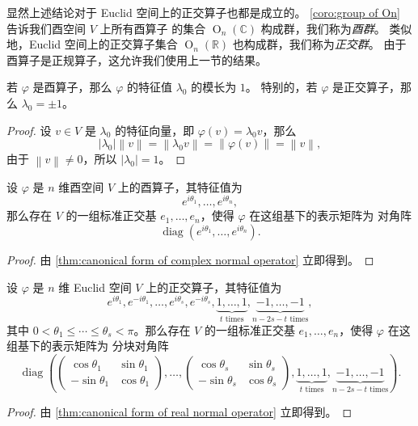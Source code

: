 \documentclass[fontset=none,zihao=-4]{Notes}
\DeclareMathOperator\diag{diag}
\DeclareMathOperator\Or{O}
\newcommand{\norm}[1]{\left\lVert#1\right\rVert}
\begin{document}
显然上述结论对于 Euclid 空间上的正交算子也都是成立的。
\autoref{coro:group of On} 告诉我们酉空间 $V$ 上所有酉算子
的集合 $\Or_n(\mathbb{C})$ 构成群，我们称为\emph{酉群}。
类似地，Euclid 空间上的正交算子集合 $\Or_n(\mathbb{R})$ 也构成群，我们称为\emph{正交群}。
由于酉算子是正规算子，这允许我们使用上一节的结果。

\begin{theorem}
  若 $\varphi$ 是酉算子，那么 $\varphi$ 的特征值 $\lambda_0$ 的模长为 $1$。
  特别的，若 $\varphi$ 是正交算子，那么 $\lambda_0=\pm 1$。 
\end{theorem}
\begin{proof}
  设 $v\in V$ 是 $\lambda_0$ 的特征向量，即 $\varphi(v)=\lambda_0v$，那么
  \[
    |\lambda_0|\norm{v}=\norm{\lambda_0v}
    =\norm{\varphi(v)}=\norm{v},
  \]
  由于 $\norm{v}\neq 0$，所以 $|\lambda_0|=1$。
\end{proof}

\begin{theorem}[酉算子的酉相似]
  设 $\varphi$ 是 $n$ 维酉空间 $V$ 上的酉算子，其特征值为
  \[
    e^{i\theta_1},\dots,e^{i\theta_n},  
  \]
  那么存在 $V$
  的一组标准正交基 $e_1,\dots,e_n$，使得 $\varphi$ 在这组基下的表示矩阵为
  对角阵
  \[
    \diag(e^{i\theta_1},\dots,e^{i\theta_n})  .
  \]
\end{theorem}
\begin{proof}
  由 \autoref{thm:canonical form of complex normal operator} 立即得到。
\end{proof}

\begin{theorem}[正交算子的正交相似]
  设 $\varphi$ 是 $n$ 维 Euclid 空间 $V$ 上的正交算子，其特征值为
  \[
    e^{i\theta_1},e^{-i\theta_1},\dots,e^{i\theta_s},e^{-i\theta_s},
    \underbrace{1,\dots,1}_{\text{$t$ times}},
    \underbrace{-1,\dots,-1}_{\text{$n-2s-t$ times}},
  \]
  其中 $0<\theta_1\leq\cdots\leq \theta_s<\pi$。那么存在 $V$
  的一组标准正交基 $e_1,\dots,e_n$，使得 $\varphi$ 在这组基下的表示矩阵为
  分块对角阵
  \[
    \diag\left(
      \begin{pmatrix}
        \cos\theta_1 & \sin\theta_1\\
        -\sin\theta_1 & \cos\theta_1
      \end{pmatrix},\dots,
      \begin{pmatrix}
        \cos\theta_s & \sin\theta_s\\
        -\sin\theta_s & \cos\theta_s
      \end{pmatrix},
      \underbrace{1,\dots,1}_{\text{$t$ times}},
      \underbrace{-1,\dots,-1}_{\text{$n-2s-t$ times}}
    \right)  .
  \]
\end{theorem}
\begin{proof}
  由 \autoref{thm:canonical form of real normal operator} 立即得到。
\end{proof}
\end{document}
